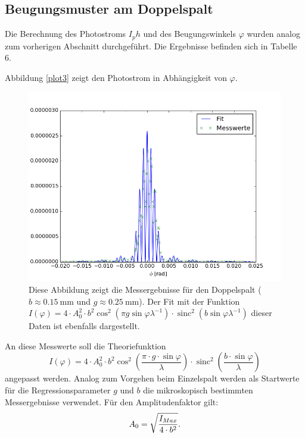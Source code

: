 \documentclass[11pt,ngerman,a4paper]{article}
\begin{document}
\subsection{Beugungsmuster am Doppelspalt}

Die Berechnung des Photostroms $I_ph$ und des Beugungswinkels $\varphi$ wurden analog zum vorherigen Abschnitt durchgeführt. Die Ergebnisse befinden sich in Tabelle 6.

\noindent
Abbildung \ref{plot3} zeigt den Photostrom in Abhängigkeit von $\varphi$.
\begin{figure}[H]
\centering
\includegraphics[scale=0.8]{plot2.png}
\caption{Diese Abbildung zeigt die Messergebnisse für den Doppelspalt ($b \approx \SI{0.15}{\milli\meter}$ und $g\approx \SI{0.25}{\milli\meter}$). Der Fit mit der Funktion $I(\varphi) = 4 \cdot A_0^2\cdot b^2\cos^2\left(\pi g  \sin \varphi\lambda^{-1}\right)\cdot \operatorname{sinc}^2\left(b\sin\varphi\lambda^{-1}\right)$  dieser Daten  ist ebenfalls dargestellt.}
\label{plot0}
\end{figure}
\noindent
An diese Messwerte soll die Theoriefunktion
\begin{equation}
I(\varphi) = 4 \cdot A_0^2\cdot b^2\cos^2\left(\frac{\pi\cdot g \cdot \sin \varphi}{\lambda}\right)\cdot \operatorname{sinc}^2\left( \frac{b\cdot\sin{\varphi}}{\lambda}\right)
\end{equation}
angepasst werden. Analog zum Vorgehen beim Einzelspalt werden als Startwerte für die Regressionsparameter $g$ und $b$ die mikroskopisch bestimmten Messergebnisse verwendet. Für den Amplitudenfaktor gilt:
\[
A_0 = \sqrt{\frac{I_{Max}}{4\cdot b^2}}\rm.
\]
\end{document}
